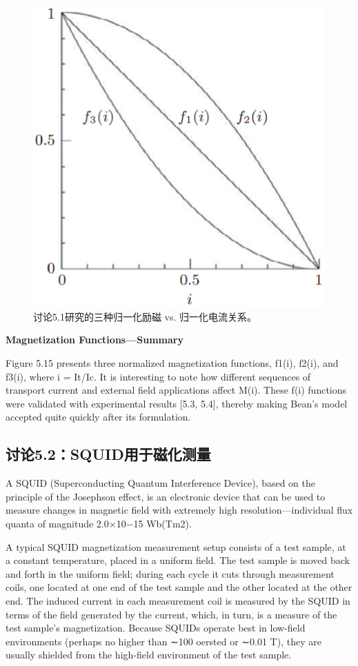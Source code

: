 \begin{figure}[htbp]
	\centering
	\includegraphics[scale=0.6]{chpt5/figs/fig5.15.eps}
	\caption{讨论5.1研究的三种归一化励磁 vs. 归一化电流关系。}
\end{figure}

\textbf{Magnetization Functions—Summary}

Figure 5.15 presents three normalized magnetization functions, f1(i), f2(i), and
f3(i), where i = It/Ic. It is interesting to note how different sequences of transport
current and external field applications affect M(i). These f(i) functions were validated
with experimental results [5.3, 5.4], thereby making Bean’s model accepted
quite quickly after its formulation.



\subsection{讨论5.2：SQUID用于磁化测量}
A SQUID (Superconducting Quantum Interference Device), based on the principle
of the Josephson effect, is an electronic device that can be used to measure
changes in magnetic field with extremely high resolution—individual flux quanta
of magnitude 2.0×10−15 Wb(Tm2).

A typical SQUID magnetization measurement setup consists of a test sample, at
a constant temperature, placed in a uniform field. The test sample is moved back
and forth in the uniform field; during each cycle it cuts through measurement
coils, one located at one end of the test sample and the other located at the other
end. The induced current in each measurement coil is measured by the SQUID in
terms of the field generated by the current, which, in turn, is a measure of the test
sample’s magnetization. Because SQUIDs operate best in low-field environments
(perhaps no higher than ∼100 oersted or ∼0.01 T), they are usually shielded from
the high-field environment of the test sample.



